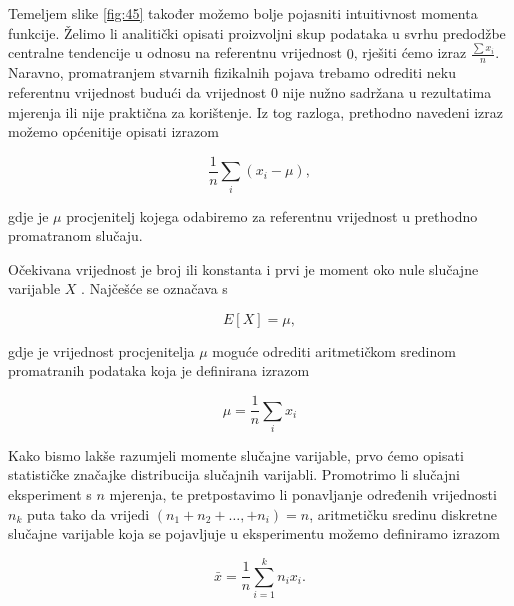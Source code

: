 \documentclass[a4paper,12pt,oneside]{memoir}
\begin{document}
                Temeljem slike \ref{fig:45} također možemo bolje pojasniti intuitivnost momenta funkcije. Želimo li analitički opisati proizvoljni skup podataka u svrhu predodžbe centralne tendencije u odnosu na referentnu vrijednost $0$, rješiti ćemo izraz $\frac{\sum x_i}{n}$. Naravno, promatranjem stvarnih fizikalnih pojava trebamo odrediti neku referentnu vrijednost budući da vrijednost $0$ nije nužno sadržana u rezultatima mjerenja ili nije praktična za korištenje. Iz tog razloga, prethodno navedeni izraz možemo općenitije opisati izrazom

                \begin{equation}
                    \frac{1}{n}\displaystyle\sum_{i}^{}(x_i-\mu),
                \end{equation}

                gdje je $\mu$ procjenitelj kojega odabiremo za referentnu vrijednost u prethodno promatranom slučaju.

                Očekivana vrijednost je broj ili konstanta i prvi je moment oko nule slučajne varijable $X$ \cite{Bahovec}. Najčešće se označava s

                \begin{equation}
                    E\left[X\right]=\mu,
                    \label{eq:412}
                \end{equation}
                
                gdje je vrijednost procjenitelja $\mu$ moguće odrediti aritmetičkom sredinom promatranih podataka koja je definirana izrazom

                \begin{equation}
                    \mu=\frac{1}{n}\displaystyle\sum_{i}^{}x_i
                \end{equation}

                Kako bismo lakše razumjeli momente slučajne varijable, prvo ćemo opisati statističke značajke distribucija slučajnih varijabli. Promotrimo li slučajni eksperiment s $n$ mjerenja, te pretpostavimo li ponavljanje određenih vrijednosti $n_k$ puta tako da vrijedi $(n_1+n_2+\ldots,+n_i)=n$, aritmetičku sredinu diskretne slučajne varijable koja se pojavljuje u eksperimentu možemo definiramo izrazom

                \begin{equation}
                    \bar{x}=\frac{1}{n}\displaystyle\sum_{i=1}^{k}n_ix_i.
                \end{equation}
\end{document}
